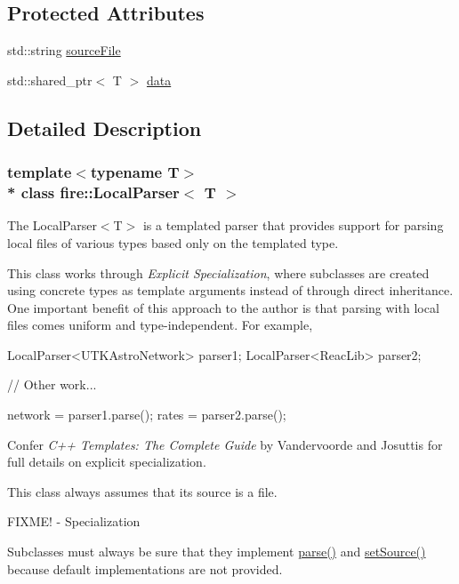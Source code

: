 \subsection*{Protected Attributes}
\begin{DoxyCompactItemize}
\item 
std\+::string \hyperlink{a00196_acf921ee916266efe70be5b24bec37fce}{source\+File}
\item 
std\+::shared\+\_\+ptr$<$ T $>$ \hyperlink{a00196_af8f722c7e35378c69e76e4275d384d86}{data}
\end{DoxyCompactItemize}


\subsection{Detailed Description}
\subsubsection*{template$<$typename T$>$\\*
class fire\+::\+Local\+Parser$<$ T $>$}

The Local\+Parser$<$\+T$>$ is a templated parser that provides support for parsing local files of various types based only on the templated type.

This class works through {\itshape Explicit Specialization}, where subclasses are created using concrete types as template arguments instead of through direct inheritance. One important benefit of this approach to the author is that parsing with local files comes uniform and type-\/independent. For example,


\begin{DoxyCode}
LocalParser<UTKAstroNetwork> parser1;
LocalParser<ReacLib> parser2;

\textcolor{comment}{// Other work...}

network = parser1.parse();
rates = parser2.parse();
\end{DoxyCode}


Confer {\itshape C++ Templates\+: The Complete Guide} by Vandervoorde and Josuttis for full details on explicit specialization.

This class always assumes that its source is a file.

F\+I\+X\+M\+E! -\/ Specialization

Subclasses must always be sure that they implement \hyperlink{a00196_abd8929aea06c2dda40256d2e58236650}{parse()} and \hyperlink{a00196_afcaec6429fdd6e5d53642a32c001ff73}{set\+Source()} because default implementations are not provided. 

